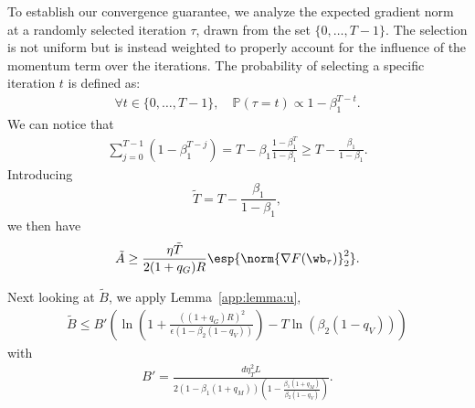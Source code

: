 \documentclass[11pt, letterpaper]{article}
\begin{document}
To establish our convergence guarantee, we analyze the expected gradient norm at a randomly selected iteration $\tau$, drawn from the set $\{0, \ldots, T-1\}$. The selection is not uniform but is instead weighted to properly account for the influence of the momentum term over the iterations. The probability of selecting a specific iteration $t$ is defined as:
\begin{align}
\label{app:eq:def_tau_main}
    \forall t \in \{0, \ldots, T-1\}, \quad \mathbb{P}(\tau = t) \propto 1 - \beta_1^{T-t}.
\end{align}
We can notice that
\begin{align}
\label{app:eq:bound_sum_prob_main}
 \sum_{j=0}^{T-1} (1 - \beta_1^{T - j}) = T - \beta_1 \frac{1 - \beta_1^{T}}{1 - \beta_1} \geq T - \frac{\beta_1}{1 - \beta_1}.
\end{align}
Introducing
\begin{equation}
\label{app:eq:deftn_main}
    \tilde{T} = T - \frac{\beta_1}{1 - \beta_1},
\end{equation}
we then have
\begin{align}
\label{app:eq:bound_a_adam_main}
    \tilde{A} \geq \frac{\eta \tilde{T}}{2 (1+q_G)R}\esp{\norm{\nabla F(\wb_{\tau})}_2^2}.
\end{align}

Next looking at $\tilde{B}$, we apply Lemma~\ref{app:lemma:u},
\begin{align}
    \tilde{B} \leq B' \left(\ln\left(1 + \frac{((1+q_G)R)^2}{\epsilon(1-\beta_2(1-q_V))}\right) - T\ln(\beta_2(1-q_V))\right)
    \label{app:eq:common_b_bound_main}
\end{align}
with
\begin{gather}
    B'= \frac{d\eta_T^2 L}{2(1 - \beta_1(1+q_M))(1 - \frac{\beta_1(1+q_M)}{\beta_2(1-q_V)})}.
\end{gather}
\end{document}
